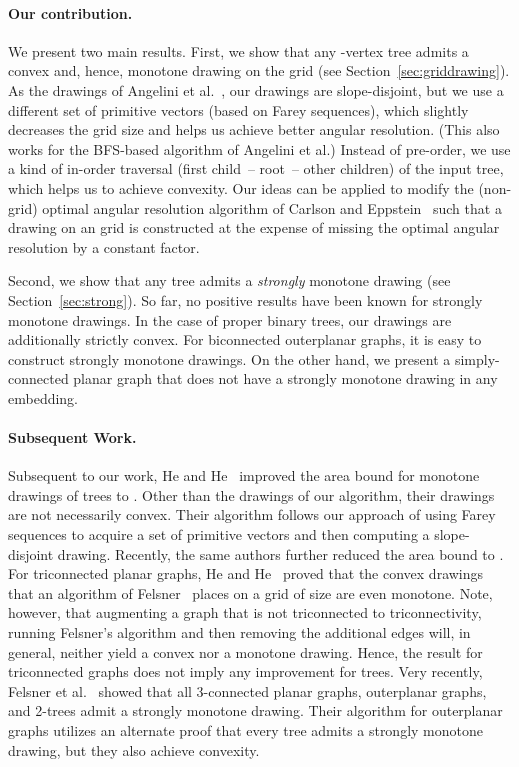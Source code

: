 \documentclass[a4paper,11pt]{article}
\theoremstyle{plain}
\begin{document}
\paragraph{Our contribution.} 
We present two main results.  First, we show that any -vertex tree
admits a convex and, hence, monotone drawing on the  grid (see Section~\ref{sec:griddrawing}).  As the drawings of
Angelini et al.~\cite{acbfp-mdg-12}, our drawings are slope-disjoint, but
we use a different set of primitive vectors (based on Farey sequences),
which slightly decreases the grid size and helps us achieve better angular resolution.  (This also works
for the BFS-based algorithm of Angelini et al.)  Instead of pre-order,
we use a kind of in-order traversal (first child~-- root~-- other 
children) of the input tree, which helps us to achieve convexity.
Our ideas can be applied to modify the (non-grid) optimal angular resolution 
algorithm of Carlson and Eppstein~\cite{ce-tcfoa-GD06} such that
a drawing on an  grid is constructed at the expense of missing the optimal
angular resolution by a constant factor. 

Second, we show that any tree admits a \emph{strongly} monotone
drawing (see Section~\ref{sec:strong}).  So far, no positive results
have been known for strongly monotone drawings.
In the case of proper binary trees, 
our drawings are additionally strictly convex.  For biconnected outerplanar
graphs, it is easy to construct strongly monotone drawings.  On the
other hand, we present a simply-connected planar
graph that does not have a strongly monotone drawing in any embedding.

\paragraph{Subsequent Work.} Subsequent to our work, He and He~\cite{hh-cmdt-COCOON15} 
improved the area bound for monotone drawings of trees to 
.  Other than the drawings of
  our algorithm, their drawings are not necessarily convex.  Their
algorithm follows our approach  
of using Farey sequences to acquire a set of primitive vectors and then
computing a slope-disjoint
drawing. Recently, the same authors \cite{hh-nomdot-TCS16}
  further reduced the area bound to .
For triconnected planar graphs, He and He~\cite{hh-md3cp-ESA15} proved
that the convex drawings that an algorithm of
Felsner~\cite{f-cdpgo-O01} places on a grid of size 
are even monotone.  Note, however, that augmenting a graph that is not triconnected to triconnectivity, running Felsner's algorithm and then
removing the additional edges will, in general, neither yield a convex
nor a monotone drawing.  Hence, the result for triconnected graphs
does not imply any improvement for trees.
Very recently, Felsner et al.~\cite{fikkms-smdpg-socg16} showed that
all 3-connected planar graphs, outerplanar graphs, and 2-trees admit a strongly
monotone drawing. Their algorithm for outerplanar graphs utilizes an alternate
proof that every tree admits a strongly monotone drawing, but they also achieve
convexity.
\end{document}
